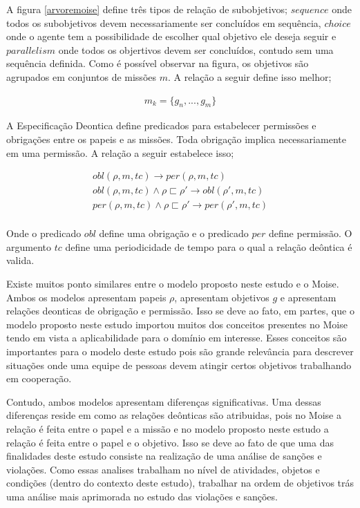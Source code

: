 \documentclass[12pt]{article}
\begin{document}
A figura \ref{arvoremoise} define três tipos de relação de subobjetivos; $sequence$ onde todos os subobjetivos devem necessariamente ser concluídos em sequência, $choice$ onde o agente tem a possibilidade de escolher qual objetivo ele deseja seguir e $parallelism$ onde todos os objertivos devem ser concluídos, contudo sem uma sequência definida. Como é possível observar na figura, os objetivos são agrupados em conjuntos de missões $m$. A relação a seguir define isso melhor;

\begin{eqnarray}\nonumber
	m_k = \{ g_n,...,g_m\}
\end{eqnarray}


A Especificação Deontica define predicados para estabelecer permissões e obrigações entre os papeis e as missões. Toda obrigação implica necessariamente em uma permissão. A relação a seguir estabelece isso; 

\begin{eqnarray}\nonumber
	obl(\rho,m,tc) \to per(\rho,m,tc) \\
	obl(\rho,m,tc) \wedge \rho \sqsubset \rho' \to obl(\rho',m,tc) \\
	per(\rho,m,tc) \wedge \rho \sqsubset \rho' \to per(\rho',m,tc) \\	
\end{eqnarray}

Onde o predicado $obl$ define uma obrigação e o predicado $per$ define permissão. O argumento $tc$ define uma periodicidade de tempo para o qual a relação deôntica é valida. 

Existe muitos ponto similares entre o modelo proposto neste estudo e o Moise. Ambos os modelos apresentam papeis $\rho$, apresentam objetivos $g$ e apresentam relações deonticas de obrigação e permissão. Isso se deve ao fato, em partes, que o modelo proposto neste estudo importou muitos dos conceitos presentes no Moise tendo em vista a aplicabilidade para o domínio em interesse. Esses conceitos são importantes para o modelo deste estudo pois são grande relevância para descrever situações onde uma equipe de pessoas devem atingir certos objetivos trabalhando em cooperação. 

Contudo, ambos modelos apresentam diferenças significativas. Uma dessas diferenças reside em como as relações deônticas são atribuidas, pois no Moise a relação é feita entre o papel e a missão e no modelo proposto neste estudo a relação é feita entre o papel e o objetivo. Isso se deve ao fato de que uma das finalidades deste estudo consiste na realização de uma análise de sanções e violações. Como essas analises trabalham no nível de atividades, objetos e condições (dentro do contexto deste estudo), trabalhar na ordem de objetivos trás uma análise mais aprimorada no estudo das violações e sanções. 
\end{document}
